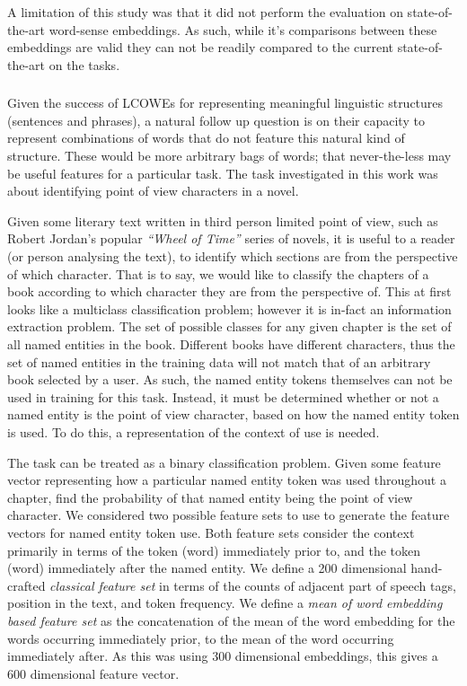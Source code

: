 \documentclass{book}
\begin{document}
A limitation of this study was that it did not perform the evaluation on state-of-the-art word-sense embeddings.
As such, while it's comparisons between these embeddings are valid they
can not be readily compared to the current state-of-the-art on the tasks.


\subsubsection{ }

Given the success of LCOWEs for representing meaningful linguistic structures (sentences and phrases),
a natural follow up question is on their capacity to represent combinations of words that do not feature this natural kind of structure.
These would be more arbitrary bags of words; that never-the-less may be useful features for a particular task.
The task investigated in this work was about identifying point of view characters in a novel.

Given some literary text written in third person limited point of view, such as Robert Jordan's popular \textit{``Wheel of Time''} series of novels,
it is useful to a reader (or person analysing the text), to identify which sections are from the perspective of which character.
That is to say, we would like to classify the chapters of a book according to which character they are from the perspective of.
This at first looks like a multiclass classification problem;
however it is in-fact an information extraction problem.
The set of possible classes for any given chapter is the set of all named entities in the book.
Different books have different characters,
thus the set of named entities in the training data will not match that of an arbitrary book selected by a user.
As such, the named entity tokens themselves can not be used in training for this task.
Instead, it must be determined whether or not a named entity is the point of view character, based on how the named entity token is used.
To do this, a representation of the context of use is needed.


The task can be treated as a binary classification problem.
Given some feature vector representing how a particular named entity token was used throughout a chapter,
find the probability of that named entity being the point of view character.
We considered two possible feature sets to use to generate the feature vectors for named entity token use.
Both feature sets consider the context primarily in terms of the token (word) immediately prior to, and the token (word) immediately after the named entity.
We define a 200 dimensional hand-crafted \emph{classical feature set} in terms of the counts of adjacent part of speech tags, position in the text, and token frequency.
We define a \emph{mean of word embedding based feature set} as the concatenation of the mean of the word embedding for the words occurring immediately prior, to the mean of the word occurring immediately after.
As this was using 300 dimensional embeddings, this gives a 600 dimensional feature vector.
\end{document}
